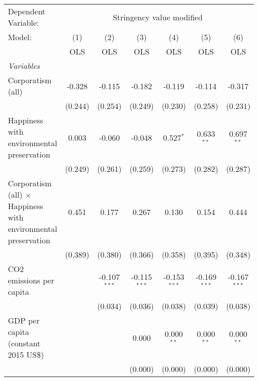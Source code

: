 
\begingroup
\centering
\begin{tabular}{lcccccc}
   \toprule
   Dependent Variable: & \multicolumn{6}{c}{Stringency value modified}\\
   Model:                                                                & (1)     & (2)            & (3)            & (4)            & (5)            & (6)\\  
                                                                         &  OLS    & OLS            & OLS            & OLS            & OLS            & OLS\\  
   \midrule
   \emph{Variables}\\
   Corporatism (all)                                                     & -0.328  & -0.115         & -0.182         & -0.119         & -0.114         & -0.317\\   
                                                                         & (0.244) & (0.254)        & (0.249)        & (0.230)        & (0.258)        & (0.231)\\   
   Happiness with environmental preservation                             & 0.003   & -0.060         & -0.048         & 0.527$^{*}$    & 0.633$^{**}$   & 0.697$^{**}$\\   
                                                                         & (0.249) & (0.261)        & (0.259)        & (0.273)        & (0.282)        & (0.287)\\   
   Corporatism (all) $\times$ Happiness with environmental preservation  & 0.451   & 0.177          & 0.267          & 0.130          & 0.154          & 0.444\\   
                                                                         & (0.389) & (0.380)        & (0.366)        & (0.358)        & (0.395)        & (0.348)\\   
   CO2 emissions per capita                                              &         & -0.107$^{***}$ & -0.115$^{***}$ & -0.153$^{***}$ & -0.169$^{***}$ & -0.167$^{***}$\\   
                                                                         &         & (0.034)        & (0.036)        & (0.038)        & (0.039)        & (0.038)\\   
   GDP per capita (constant 2015 US\$)                                   &         &                & 0.000          & 0.000$^{**}$   & 0.000$^{**}$   & 0.000$^{**}$\\   
                                                                         &         &                & (0.000)        & (0.000)        & (0.000)        & (0.000)\\   

\end{tabular}
